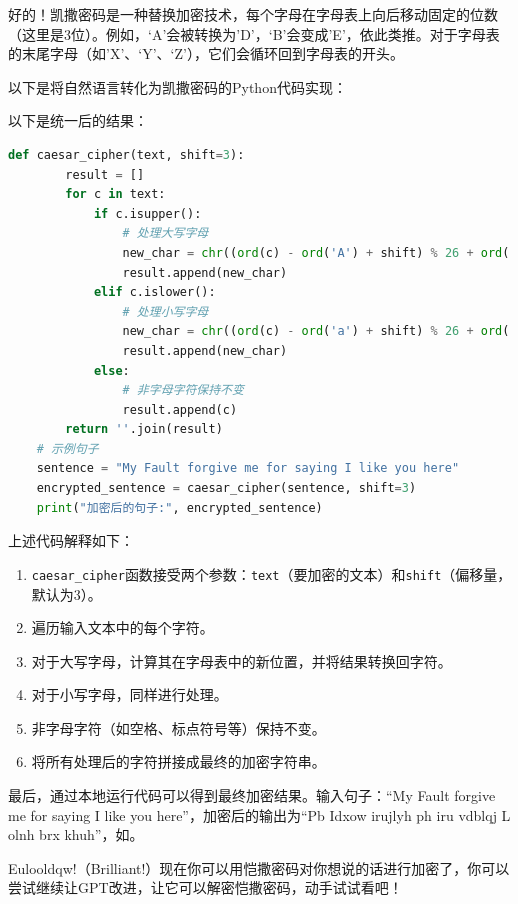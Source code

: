 \begin{gptbox}
\footnotesize{好的！凯撒密码是一种替换加密技术，每个字母在字母表上向后移动固定的位数（这里是3位）。例如，`A'会被转换为'D'，`B'会变成'E'，依此类推。对于字母表的末尾字母（如'X'、`Y'、`Z'），它们会循环回到字母表的开头。

以下是将自然语言转化为凯撒密码的Python代码实现：
}
\small{
以下是统一后的结果：
\begin{lstlisting}[language=Python]
    def caesar_cipher(text, shift=3):
        result = []
        for c in text:
            if c.isupper():
                # 处理大写字母
                new_char = chr((ord(c) - ord('A') + shift) % 26 + ord('A'))
                result.append(new_char)
            elif c.islower():
                # 处理小写字母
                new_char = chr((ord(c) - ord('a') + shift) % 26 + ord('a'))
                result.append(new_char)
            else:
                # 非字母字符保持不变
                result.append(c)
        return ''.join(result)
    # 示例句子
    sentence = "My Fault forgive me for saying I like you here"
    encrypted_sentence = caesar_cipher(sentence, shift=3)
    print("加密后的句子:", encrypted_sentence)
\end{lstlisting}
}
\end{gptbox}

上述代码解释如下：

\begin{enumerate}
  \def\labelenumi{\arabic{enumi}.}

  \item
        \texttt{caesar\_cipher}函数接受两个参数：\texttt{text}（要加密的文本）和\texttt{shift}（偏移量，默认为3）。
  \item
        遍历输入文本中的每个字符。
  \item
        对于大写字母，计算其在字母表中的新位置，并将结果转换回字符。
  \item
        对于小写字母，同样进行处理。
  \item
        非字母字符（如空格、标点符号等）保持不变。
  \item
        将所有处理后的字符拼接成最终的加密字符串。
\end{enumerate}

最后，通过本地运行代码可以得到最终加密结果。输入句子：``My Fault forgive me for saying I like you here''，加密后的输出为``Pb Idxow irujlyh ph iru vdblqj L olnh brx khuh''，如。


Eulooldqw!（Brilliant!）现在你可以用恺撒密码对你想说的话进行加密了，你可以尝试继续让GPT改进，让它可以解密恺撒密码，动手试试看吧！